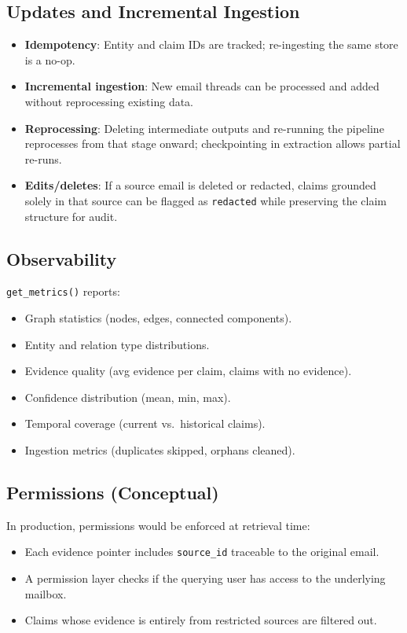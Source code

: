 \documentclass[11pt,a4paper]{article}
\begin{document}
\subsection{Updates and Incremental Ingestion}
\begin{itemize}[nosep]
    \item \textbf{Idempotency}: Entity and claim IDs are tracked; re-ingesting the same store is a no-op.
    \item \textbf{Incremental ingestion}: New email threads can be processed and added without reprocessing existing data.
    \item \textbf{Reprocessing}: Deleting intermediate outputs and re-running the pipeline reprocesses from that stage onward; checkpointing in extraction allows partial re-runs.
    \item \textbf{Edits/deletes}: If a source email is deleted or redacted, claims grounded solely in that source can be flagged as \texttt{redacted} while preserving the claim structure for audit.
\end{itemize}

\subsection{Observability}
\texttt{get\_metrics()} reports:
\begin{itemize}[nosep]
    \item Graph statistics (nodes, edges, connected components).
    \item Entity and relation type distributions.
    \item Evidence quality (avg evidence per claim, claims with no evidence).
    \item Confidence distribution (mean, min, max).
    \item Temporal coverage (current vs.\ historical claims).
    \item Ingestion metrics (duplicates skipped, orphans cleaned).
\end{itemize}

\subsection{Permissions (Conceptual)}
In production, permissions would be enforced at retrieval time:
\begin{itemize}[nosep]
    \item Each evidence pointer includes \texttt{source\_id} traceable to the original email.
    \item A permission layer checks if the querying user has access to the underlying mailbox.
    \item Claims whose evidence is entirely from restricted sources are filtered out.
\end{itemize}
\end{document}
